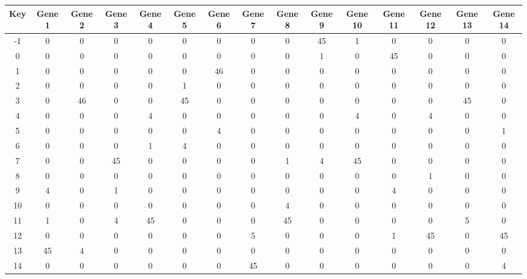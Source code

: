 \begin{tabular}{|c|c|c|c|c|c|c|c|c|c|c|c|c|c|c|}
\hline
Key & Gene 1 & Gene 2 & Gene 3 & Gene 4 & Gene 5 & Gene 6 & Gene 7 & Gene 8 & Gene 9 & Gene 10 & Gene 11 & Gene 12 & Gene 13 & Gene 14 \\
\hline
-1 & 0 & 0 & 0 & 0 & 0 & 0 & 0 & 0 & 45 & 1 & 0 & 0 & 0 & 0 \\
0 & 0 & 0 & 0 & 0 & 0 & 0 & 0 & 0 & 1 & 0 & 45 & 0 & 0 & 0 \\
1 & 0 & 0 & 0 & 0 & 0 & 46 & 0 & 0 & 0 & 0 & 0 & 0 & 0 & 0 \\
2 & 0 & 0 & 0 & 0 & 1 & 0 & 0 & 0 & 0 & 0 & 0 & 0 & 0 & 0 \\
3 & 0 & 46 & 0 & 0 & 45 & 0 & 0 & 0 & 0 & 0 & 0 & 0 & 45 & 0 \\
4 & 0 & 0 & 0 & 4 & 0 & 0 & 0 & 0 & 0 & 4 & 0 & 4 & 0 & 0 \\
5 & 0 & 0 & 0 & 0 & 0 & 4 & 0 & 0 & 0 & 0 & 0 & 0 & 0 & 1 \\
6 & 0 & 0 & 0 & 1 & 4 & 0 & 0 & 0 & 0 & 0 & 0 & 0 & 0 & 0 \\
7 & 0 & 0 & 45 & 0 & 0 & 0 & 0 & 1 & 4 & 45 & 0 & 0 & 0 & 0 \\
8 & 0 & 0 & 0 & 0 & 0 & 0 & 0 & 0 & 0 & 0 & 0 & 1 & 0 & 0 \\
9 & 4 & 0 & 1 & 0 & 0 & 0 & 0 & 0 & 0 & 0 & 4 & 0 & 0 & 0 \\
10 & 0 & 0 & 0 & 0 & 0 & 0 & 0 & 4 & 0 & 0 & 0 & 0 & 0 & 0 \\
11 & 1 & 0 & 4 & 45 & 0 & 0 & 0 & 45 & 0 & 0 & 0 & 0 & 5 & 0 \\
12 & 0 & 0 & 0 & 0 & 0 & 0 & 5 & 0 & 0 & 0 & 1 & 45 & 0 & 45 \\
13 & 45 & 4 & 0 & 0 & 0 & 0 & 0 & 0 & 0 & 0 & 0 & 0 & 0 & 0 \\
14 & 0 & 0 & 0 & 0 & 0 & 0 & 45 & 0 & 0 & 0 & 0 & 0 & 0 & 4 \\
\hline
\end{tabular}